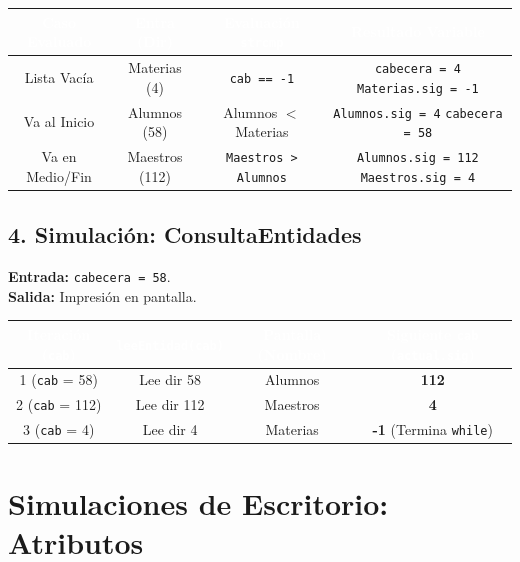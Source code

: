 \documentclass[12pt]{article}
\begin{document}
\begin{table}[H]
\centering
\renewcommand{\arraystretch}{1.05}
\begin{tabular}{|c|c|c|c|}
\hline
\rowcolor{MainBlue}
\textcolor{white}{\textbf{Caso Evaluado}} & \textcolor{white}{\textbf{Entra (Dir)}} & \textcolor{white}{\textbf{Evaluación \texttt{strcmp}}} & \textcolor{white}{\textbf{Resultado Variable}} \\
\hline
Lista Vacía & Materias (4) & \verb|cab == -1| & \verb|cabecera = 4| \verb|Materias.sig = -1| \\
\hline
Va al Inicio & Alumnos (58) & Alumnos $<$ Materias & \verb|Alumnos.sig = 4|  \verb|cabecera = 58| \\
\hline
Va en Medio/Fin & Maestros (112) & \verb|Maestros > Alumnos| \newline & \verb|Alumnos.sig = 112|  \verb|Maestros.sig = 4| \\
\hline
\end{tabular}
\end{table}

\newpage

\subsection*{4. Simulación: ConsultaEntidades}
\textbf{Entrada:} \verb|cabecera = 58|.\\
\textbf{Salida:} Impresión en pantalla.

\begin{table}[H]
\centering
\renewcommand{\arraystretch}{1.05}
\begin{tabular}{|c|c|c|c|}
\hline
\rowcolor{MainBlue}
\textcolor{white}{\textbf{Iteración (\texttt{cab})}} & \textcolor{white}{\textbf{\texttt{leeEntidad(cab)}}} & \textcolor{white}{\textbf{Pantalla (Nombre)}} & \textcolor{white}{\textbf{Siguiente \texttt{cab} (\texttt{actual.sig})}} \\
\hline
1 (\verb|cab| = 58) & Lee dir 58 & Alumnos & \textbf{112} \\
\hline
2 (\verb|cab| = 112) & Lee dir 112 & Maestros & \textbf{4} \\
\hline
3 (\verb|cab| = 4) & Lee dir 4 & Materias & \textbf{-1} (Termina \verb|while|) \\
\hline
\end{tabular}
\end{table}

\newpage
{}
\section{Simulaciones de Escritorio: Atributos}
{}
\end{document}
